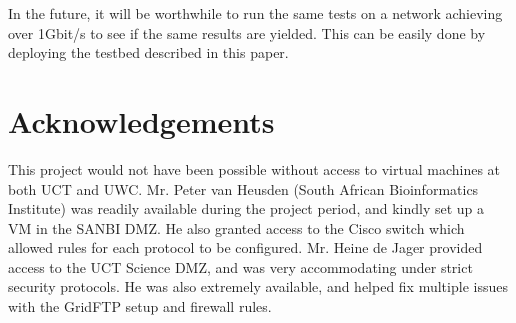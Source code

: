 \documentclass{sig-alternate-05-2015}
\begin{document}
In the future, it will be worthwhile to run the same tests on a network achieving over 1Gbit/s to see if the same results are yielded. This can be easily done by deploying the testbed described in this paper.

\section{Acknowledgements}
This project would not have been possible without access to virtual machines at both UCT and UWC. Mr. Peter van Heusden (South African Bioinformatics Institute) was readily available during the project period, and kindly set up a VM in the SANBI DMZ. He also granted access to the Cisco switch which allowed rules for each protocol to be configured. Mr. Heine de Jager provided access to the UCT Science DMZ, and was very accommodating under strict security protocols. He was also extremely available, and helped fix multiple issues with the GridFTP setup and firewall rules.



\end{document}
